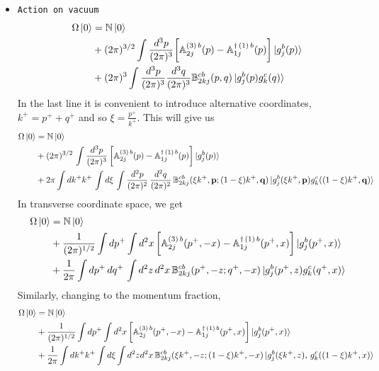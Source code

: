 \documentclass[aps,prd,amsmath,amssymb,nofootinbib]{revtex4-2}
\def\mf#1{\mathbb{#1}}
\def\v#1{\mathbf{#1}}
\numberwithin{equation}{section}
\begin{document}
\begin{itemize}
\item{\texttt{Action on vacuum}} 
\begin{align} \label{Omegaonvacmom1}
    \Omega\ket{0} & = \mf{N}\ket{0} \notag \\ &
    +(2\pi)^{3/2}\int \frac{d^3p}{(2\pi)^3}\bigg[\mf{A}^{(3)\, b}_{2j}(p)
    -\mf{A}^{\dagger\, (1)\, b}_{1j}(p)\bigg]\ket{g^{b}_{j}(p)} \notag \\ & 
    +(2\pi)^{3}\int \frac{d^3p}{(2\pi)^3} \frac{d^3q}{(2\pi)^3}  \mf{B}^{cb}_{2kj}(p,q)\ket{g^{b}_{j}(p)g^{c}_{k}(q)}
\end{align} 
In the last line it is convenient to introduce alternative coordinates, $k^+  = p^+ + q^+$ and so  $\xi = \frac{p^+}{k^+}$. This will give us 
\begin{align} \label{Omegaonvacmomzeta}
    \Omega\ket{0} & = \mf{N}\ket{0} \notag \\ &
    + (2\pi)^{3/2}\,\int \frac{d^3p}{(2\pi)^3}\,
    \bigg[\mf{A}^{(3)\, b}_{2j}(p)
    -\mf{A}^{\dagger\,(1)\, b}_{1j}(p)\bigg]\ket{g^{b}_{j}(p)} \notag \\ &
    + 2\pi \int dk^+ k^+ \,\int d \xi\,  \int \frac{d^2p}{(2\pi)^2}\, \frac{d^2q}{(2\pi)^2}\,  \mf{B}^{cb}_{2kj}(\xi k^+, \v p;  (1-\xi) k^+, \v q) \ket{g^{b}_{j}(\xi k^+, \v p)g^{c}_{k}((1-\xi) k^+, \v q)}
\end{align} 
In transverse coordinate space, we get 
\begin{align} \label{Omegaonvacpos}
    \Omega\ket{0} & = \mf{N}\ket{0} \notag \\ &
    + \frac{1}{(2\pi)^{1/2}}\int dp^{+} \int d^{2}x\,
   \bigg[\mf{A}^{(3)\, b}_{2j}(p^{+}, - x)
   -\mf{A}^{\dagger\,(1)\, b}_{1j}(p^{+},x)\bigg]\ket{g^{b}_{j}(p^{+},x)} \notag \\ & 
   +\frac{1}{2\pi}\int dp^{+}\,  dq^{+} \, \int d^{2}z\, d^{2}x\, \mf{B}^{cb}_{2kj}(p^{+},-z;q^{+},-x)\ket{g^{b}_{j}(p^{+},z)g^{c}_{k}(q^{+},x)}%
\end{align}
Similarly, changing to the momentum fraction,  
\begin{align} \label{Omegaonvacposzeta}
    \Omega\ket{0} & = \mf{N}\ket{0} \notag \\ &
    + \frac{1}{(2\pi)^{1/2}}\int dp^{+} \int d^{2}x\,
    \bigg[\mf{A}^{(3)\, b}_{2j}(p^{+}, -x)
   -\mf{A}^{\dagger\,(1)\, b}_{1j}(p^{+},x)\bigg]\ket{g^{b}_{j}(p^{+},x)} \notag \\ & 
 +\frac{1}{2\pi}\int dk^{+} k^+  \int d \xi  \int d^{2}z d^{2}x\, \mf{B}^{cb}_{2kj}(\xi k^{+},-z; (1-\xi) k^{+},-x)\ket{g^{b}_{j}(\xi k^{+},z),\,g^{c}_{k}((1-\xi)k^{+},x)}

\end{align}
\end{itemize}
\end{document}
